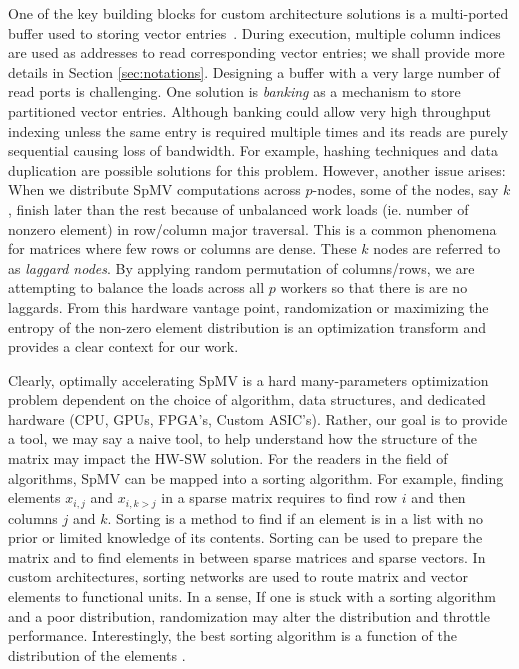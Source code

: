 \documentclass[manuscript,screen]{acmart}
\begin{document}
One of the key building blocks for custom architecture solutions is a
multi-ported buffer used to storing vector entries~\cite{fowers2014high}.  During execution,
multiple column indices are used as addresses to read corresponding
vector entries; we shall provide more details in Section
\ref{sec:notations}.  Designing a buffer with a very large number of
read ports is challenging.  One solution is {\em banking} as a
mechanism to store partitioned vector entries.  Although banking could
allow very high throughput indexing unless the same entry is required
multiple times and its reads are purely sequential causing loss of
bandwidth.  For example, hashing techniques and data duplication are
possible solutions for this problem. However, another issue arises:
When we distribute SpMV computations across $p$-nodes, some of the
nodes, say $k$, finish later than the rest because of unbalanced work
loads (ie. number of nonzero element) in row/column major
traversal. This is a common phenomena for matrices where few rows or
columns are dense. These $k$ nodes are referred to as {\em laggard
  nodes}.  By applying random permutation of columns/rows, we are
attempting to balance the loads across all $p$ workers so that there
is are no laggards. From this hardware vantage point, randomization or
maximizing the entropy of the non-zero element distribution is an
optimization transform and provides a clear context for our work.

Clearly, optimally accelerating SpMV is a hard many-parameters
optimization problem dependent on the choice of algorithm, data
structures, and dedicated hardware (CPU, GPUs, FPGA's, Custom ASIC's).
Rather, our goal is to provide a tool, we may say a naive tool, to
help understand how the structure of the matrix may impact the HW-SW
solution.  For the readers in the field of algorithms, SpMV can be
mapped into a sorting algorithm. For example, finding elements
$x_{i,j}$ and $x_{i,k>j}$ in a sparse matrix requires to find row $i$
and then columns $j$ and $k$.  Sorting is a method to find if an
element is in a list with no prior or limited knowledge of its
contents.  Sorting can be used to prepare the matrix and to find
elements in between sparse matrices and sparse vectors. In custom
architectures, sorting networks are used to route matrix and vector
elements to functional units. In a sense, If one is stuck with a
sorting algorithm and a poor distribution, randomization may alter the
distribution and throttle performance. Interestingly, the best sorting
algorithm is a function of the distribution of the elements
\cite{LiGP2004,HuangGl2009}.
\end{document}
